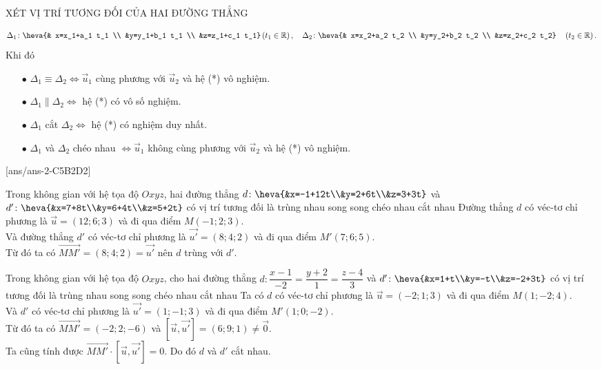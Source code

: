 \begin{dang}{XÉT VỊ TRÍ TƯƠNG ĐỐI CỦA HAI ĐƯỜNG THẲNG}
\begin{itemize}
		$$
		\Delta_1 \colon \heva{&
			x=x_1+a_1 t_1 \\
			&y=y_1+b_1 t_1 \\
			&z=z_1+c_1 t_1}\left(t_1 \in \mathbb{R}\right),\quad \Delta_2 \colon \heva{&
			x=x_2+a_2 t_2 \\
			&y=y_2+b_2 t_2 \\
			&z=z_2+c_2 t_2} \quad\left(t_2 \in \mathbb{R}\right).$$
		Khi đó 
		\begin{itemize}
			\item  [$\bullet $] $\Delta_1 \equiv \Delta_2 \Leftrightarrow \overrightarrow{u}_1$ cùng phương với $\overrightarrow{u}_2$ và hệ (*) vô nghiệm.
			\item [$\bullet $] $\Delta_1 \parallel \Delta_2 \Leftrightarrow$ hệ (*) có vô số nghiệm.
			\item [$\bullet $] $\Delta_1$ cắt $\Delta_2 \Leftrightarrow$ hệ (*) có nghiệm duy nhất.
			\item [$\bullet $] $\Delta_1$ và $\Delta_2$ chéo nhau $\Leftrightarrow \overrightarrow{u}_1$ không cùng phương với $\overrightarrow{u}_2$ và hệ (*) vô nghiệm.			
		\end{itemize}
	\end{itemize}
\end{dang}
[ans/ans-2-C5B2D2]
\TN
\begin{ex}%
	Trong không gian với hệ tọa độ $Oxyz$, hai đường thẳng $d \colon \heva{&x=-1+12t\\&y=2+6t\\&z=3+3t}$ và  $d' \colon \heva{&x=7+8t\\&y=6+4t\\&z=5+2t}$ có vị trí tương đối là
	\choice
	{\True trùng nhau}
	{song song}
	{chéo nhau}
	{cắt nhau}
	\loigiai
	{Đường thẳng $d$ có véc-tơ chỉ phương là  $\overrightarrow{u}=(12;6;3)$ và đi qua điểm $M(-1;2;3)$.\\
		Và đường thẳng $d'$ có véc-tơ chỉ phương là  $\overrightarrow{u'}=(8;4;2)$ và đi qua điểm $M'(7;6;5)$.\\
		Từ đó ta có $\overrightarrow{MM'}=(8;4;2)=\overrightarrow{u'}$ nên $d$ trùng với $d'$.}
\end{ex}
\begin{ex}%
	Trong không gian với hệ tọa độ $Oxyz$, cho hai đường thẳng $d \colon \dfrac{x-1}{-2}=\dfrac{y+2}{1}=\dfrac{z-4}{3}$ và  $ d' \colon \heva{&x=1+t\\&y=-t\\&z=-2+3t}$ có vị trí tương đối là
	\choice
	{trùng nhau}
	{song song}
	{chéo nhau}
	{\True  cắt nhau}
	\loigiai
	{Ta có 	$d$ có véc-tơ chỉ phương là  $\overrightarrow{u}=(-2;1;3)$ và đi qua điểm $M(1;-2;4)$.\\
		Và $d'$ có véc-tơ chỉ phương là  $\overrightarrow{u'}=(1;-1;3)$ và đi qua điểm $M'(1;0;-2)$.\\
		Từ đó ta có $\overrightarrow{MM'}=(-2;2;-6)$ và $ \left[\overrightarrow{u},\overrightarrow{u'} \right]=(6;9;1)\ne \overrightarrow{0}$. \\
		Ta cũng tính được $ \overrightarrow{MM'} \cdot \left[\overrightarrow{u},\overrightarrow{u'} \right]=0$. Do đó $d$ và $d'$ cắt nhau.}
\end{ex}
